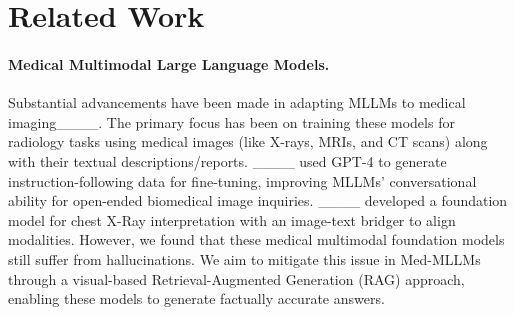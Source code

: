 \section{Related Work}
\paragraph{Medical Multimodal Large Language Models.}
Substantial advancements have been made in adapting MLLMs to medical imaging____. The primary focus has been on training these models for radiology tasks using medical images (like X-rays, MRIs, and CT scans) along with their textual descriptions/reports.
____ used GPT-4 to generate instruction-following data for fine-tuning, improving MLLMs' conversational ability for open-ended biomedical image inquiries.
____ developed a foundation model for chest X-Ray interpretation with an image-text bridger to align modalities.
However, we found that these medical multimodal foundation models still suffer from hallucinations.
We aim to mitigate this issue in Med-MLLMs through a visual-based Retrieval-Augmented Generation (RAG) approach, enabling these models to generate factually accurate answers.



